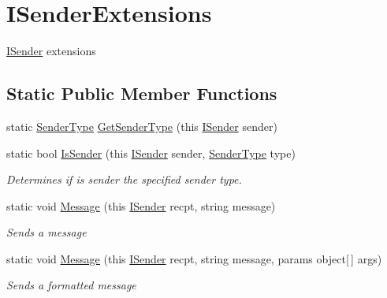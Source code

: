 \hypertarget{classOTA_1_1Command_1_1ISenderExtensions}{}\section{I\+Sender\+Extensions}
\label{classOTA_1_1Command_1_1ISenderExtensions}


\hyperlink{interfaceOTA_1_1Command_1_1ISender}{I\+Sender} extensions  


\subsection*{Static Public Member Functions}
\begin{DoxyCompactItemize}
\item 
static \hyperlink{namespaceOTA_1_1Command_ab957a14a33aecd4b104f6e4992efd342}{Sender\+Type} \hyperlink{classOTA_1_1Command_1_1ISenderExtensions_a626f661c3944fd7b282784321166f544}{Get\+Sender\+Type} (this \hyperlink{interfaceOTA_1_1Command_1_1ISender}{I\+Sender} sender)
\item 
static bool \hyperlink{classOTA_1_1Command_1_1ISenderExtensions_a6ba210eadbd46096f78e208ed0b1df3a}{Is\+Sender} (this \hyperlink{interfaceOTA_1_1Command_1_1ISender}{I\+Sender} sender, \hyperlink{namespaceOTA_1_1Command_ab957a14a33aecd4b104f6e4992efd342}{Sender\+Type} type)
\begin{DoxyCompactList}\small\item\em Determines if is sender the specified sender type. \end{DoxyCompactList}\item 
static void \hyperlink{classOTA_1_1Command_1_1ISenderExtensions_a780d10a4c8369a119447e8ea9c0c2777}{Message} (this \hyperlink{interfaceOTA_1_1Command_1_1ISender}{I\+Sender} recpt, string message)
\begin{DoxyCompactList}\small\item\em Sends a message \end{DoxyCompactList}\item 
static void \hyperlink{classOTA_1_1Command_1_1ISenderExtensions_ab4eb589780cd64244cfa85e20e3ec544}{Message} (this \hyperlink{interfaceOTA_1_1Command_1_1ISender}{I\+Sender} recpt, string message, params object\mbox{[}$\,$\mbox{]} args)
\begin{DoxyCompactList}\small\item\em Sends a formatted message \end{DoxyCompactList}\item 

\end{DoxyCompactItemize}
